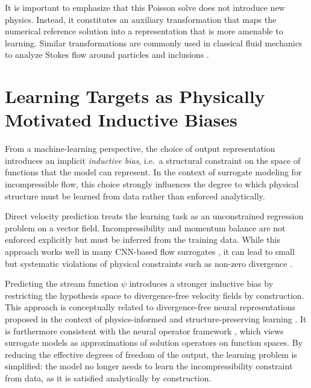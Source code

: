It is important to emphasize that this Poisson solve does not introduce new
physics. Instead, it constitutes an auxiliary transformation that maps the
numerical reference solution into a representation that is more amenable to
learning. Similar transformations are commonly used in classical fluid
mechanics to analyze Stokes flow around particles and inclusions \parencite{happel_low_1983,ladd_numerical_nodate}.


\section{Learning Targets as Physically Motivated Inductive Biases}
\label{sec:inductive_bias}

From a machine-learning perspective, the choice of output representation
introduces an implicit \emph{inductive bias}, i.e.\ a structural constraint on
the space of functions that the model can represent.
In the context of surrogate modeling for incompressible flow, this choice
strongly influences the degree to which physical structure must be learned
from data rather than enforced analytically.

Direct velocity prediction treats the learning task as an unconstrained
regression problem on a vector field. Incompressibility and momentum balance
are not enforced explicitly but must be inferred from the training data. While
this approach works well in many CNN-based flow surrogates
\parencite{ribeiro_deepcfd_nodate,chen_u-net_nodate,thuerey_deep_2020}, it can lead to
small but systematic violations of physical constraints such as non-zero divergence \parencite{richter-powell_neural_2022}.

Predicting the stream function $\psi$ introduces a stronger inductive bias by
restricting the hypothesis space to divergence-free velocity fields by
construction. This approach is conceptually related to divergence-free neural
representations proposed in the context of physics-informed and
structure-preserving learning \parencite{richter-powell_neural_2022}.
It is furthermore consistent with the neural operator framework
\parencite{kovachki_neural_nodate}, which views surrogate models as
approximations of solution operators on function spaces. By reducing
the effective degrees of freedom of the output, the learning problem is
simplified: the model no longer needs to learn the incompressibility
constraint from data, as it is satisfied analytically by construction.

